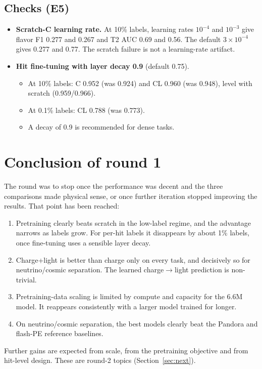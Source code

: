 \documentclass[11pt,a4paper]{article}
\begin{document}
\subsection{Checks (E5)}
\begin{itemize}
  \item \textbf{Scratch-C learning rate.} At 10\% labels, learning rates $10^{-4}$ and $10^{-3}$ give flavor F1 0.277 and 0.267 and T2 AUC 0.69 and 0.56. The default $3\times10^{-4}$ gives 0.277 and 0.77. The scratch failure is not a learning-rate artifact.
  \item \textbf{Hit fine-tuning with layer decay 0.9} (default 0.75).
  \begin{itemize}
    \item At 10\% labels: C 0.952 (was 0.924) and CL 0.960 (was 0.948), level with scratch (0.959/0.966).
    \item At 0.1\% labels: CL 0.788 (was 0.773).
    \item A decay of 0.9 is recommended for dense tasks.
  \end{itemize}
\end{itemize}

\section{Conclusion of round 1}\label{sec:conclusion}
The round was to stop once the performance was decent and the three comparisons made physical sense, or once further iteration stopped improving the results. That point has been reached:
\begin{enumerate}
  \item Pretraining clearly beats scratch in the low-label regime, and the advantage narrows as labels grow. For per-hit labels it disappears by about 1\% labels, once fine-tuning uses a sensible layer decay.
  \item Charge+light is better than charge only on every task, and decisively so for neutrino/cosmic separation. The learned charge$\to$light prediction is non-trivial.
  \item Pretraining-data scaling is limited by compute and capacity for the 6.6M model. It reappears consistently with a larger model trained for longer.
  \item On neutrino/cosmic separation, the best models clearly beat the Pandora and flash-PE reference baselines.
\end{enumerate}
Further gains are expected from scale, from the pretraining objective and from hit-level design. These are round-2 topics (Section~\ref{sec:next}).
\end{document}
